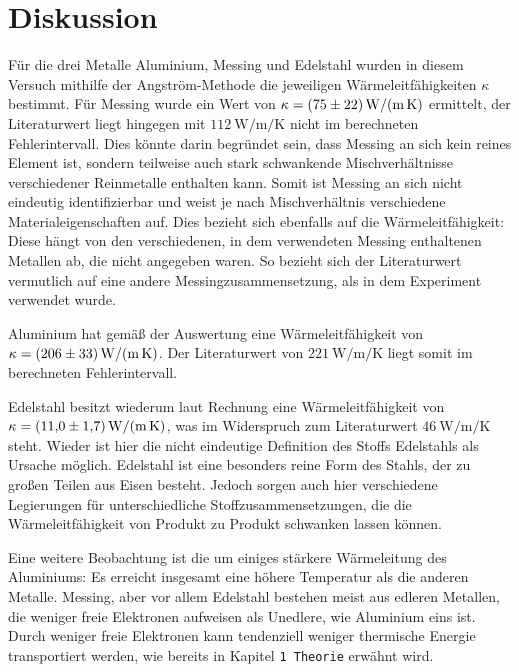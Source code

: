 \section{Diskussion}
\label{sec:Diskussion}
Für die drei Metalle Aluminium, Messing und Edelstahl wurden in diesem Versuch mithilfe der Angström-Methode 
die jeweiligen Wärmeleitfähigkeiten $\kappa$ bestimmt.
Für Messing wurde ein Wert von $\kappa = \SI{75 \pm 22}{\watt\per\meter\per\kelvin}$ ermittelt, der Literaturwert liegt 
hingegen mit $\SI{112}{\watt\per\meter\per\kelvin}$ nicht im berechneten Fehlerintervall. 
Dies könnte darin begründet sein, dass Messing an sich kein reines Element ist, sondern teilweise auch stark schwankende 
Mischverhältnisse verschiedener Reinmetalle enthalten kann. 
Somit ist Messing an sich nicht eindeutig identifizierbar und weist je nach Mischverhältnis verschiedene 
Materialeigenschaften auf. 
Dies bezieht sich ebenfalls auf die Wärmeleitfähigkeit: Diese hängt von den verschiedenen, in dem verwendeten 
Messing enthaltenen Metallen ab, die nicht angegeben waren. So bezieht sich der Literaturwert vermutlich auf eine andere
Messingzusammensetzung, als in dem Experiment verwendet wurde. 

Aluminium hat gemäß der Auswertung eine Wärmeleitfähigkeit von \\
$\kappa = \SI{206 \pm 33}{\watt\per\meter\per\kelvin}$.
Der Literaturwert von $\SI{221}{\watt\per\meter\per\kelvin}$ liegt somit im berechneten Fehlerintervall.

Edelstahl besitzt wiederum laut Rechnung eine Wärmeleitfähigkeit von \\
$\kappa = \SI{11.0 \pm 1.7}{\watt\per\meter\per\kelvin}$, 
was im Widerspruch zum Literaturwert $\SI{46}{\watt\per\meter\per\kelvin}$ steht. 
Wieder ist hier die nicht eindeutige Definition des Stoffs Edelstahls als Ursache möglich. 
Edelstahl ist eine besonders reine Form des Stahls, der zu großen Teilen aus Eisen besteht. 
Jedoch sorgen auch hier verschiedene Legierungen für unterschiedliche Stoffzusammensetzungen, die die Wärmeleitfähigkeit 
von Produkt zu Produkt schwanken lassen können. 

Eine weitere Beobachtung ist die um einiges stärkere Wärmeleitung des Aluminiums: Es erreicht insgesamt eine höhere Temperatur
als die anderen Metalle. Messing, aber vor allem Edelstahl bestehen meist aus edleren Metallen, die weniger freie Elektronen 
aufweisen als Unedlere, wie Aluminium eins ist. Durch weniger freie Elektronen kann tendenziell weniger thermische 
Energie transportiert werden, wie bereits in Kapitel \texttt{1 Theorie} erwähnt wird. 
